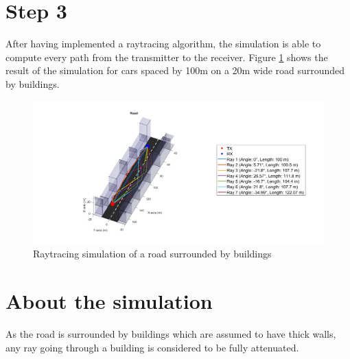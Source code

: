 \documentclass[10pt,a4paper]{ULBreport}
\begin{document}
\section{Step 3}

After having implemented a raytracing algorithm, the simulation is able to compute every path from the transmitter to the receiver. Figure \ref{fig:raytracingDemo} shows the result of the simulation for cars spaced by 100m on a 20m wide road surrounded by buildings.

\begin{figure}[H]
    \centering
    \includegraphics[width=1\textwidth]{3_1.png}
    \caption{Raytracing simulation of a road surrounded by buildings}
    \label{fig:raytracingDemo}
\end{figure}

\section{About the simulation}

As the road is surrounded by buildings which are assumed to have thick walls, any ray going through a building is considered to be fully attenuated.



\end{document}
